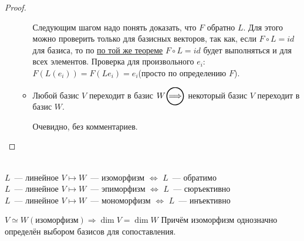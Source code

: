 \begin{proof}
\begin{enumerate}
\begin{itemize}
                    Следующим шагом надо понять доказать, что $F$ обратно $L$. Для этого можно проверить
                    только для базисных векторов, так как, если $F\circ L = id$ для базиса, то по \hyperref[thm:Линейное отображение однозначно задаётся двумя базисами]
                    {по той же теореме} $F\circ L = id$ будет выполняться и для всех элементов.
                    Проверка для произвольного $e_i$: $F(L(e_i)) = F(Le_i) = e_i$(просто по определению $F$).
                \item
                    Любой базис $V$ переходит в базис $W\ora $ некоторый базис $V$ переходит в базис $W$.

                    Очевидно, без комментариев.
            \end{itemize}
    \end{enumerate}
\end{proof}
\begin{definition}\leavevmode\\
    $L$~--- линейное $V\mapsto W$~--- изоморфизм $\Leftrightarrow$ $L$~--- обратимо\\
    $L$~--- линейное $V\mapsto W$~--- эпиморфизм $\Leftrightarrow$ $L$~--- сюръективно\\
    $L$~--- линейное $V\mapsto W$~--- мономорфизм $\Leftrightarrow$ $L$~--- инъективно
\end{definition}
\begin{remark}
    $V\simeq W(\text{изоморфизм})\Rightarrow  \dim V = \dim W$
    Причём изоморфизм однозначно определён выбором базисов для сопоставления.
\end{remark}
